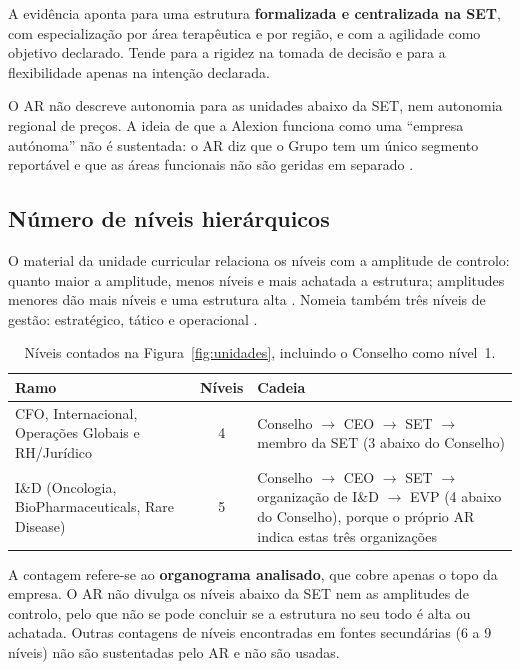 \begin{analysis}
A evidência aponta para uma estrutura \textbf{formalizada e centralizada na SET}, com especialização por área terapêutica e por região, e com a agilidade como objetivo declarado. Tende para a rigidez na tomada de decisão e para a flexibilidade apenas na intenção declarada.
\end{analysis}

\begin{sourceslimit}
O AR não descreve autonomia para as unidades abaixo da SET, nem autonomia regional de preços. A ideia de que a Alexion funciona como uma ``empresa autónoma'' não é sustentada: o AR diz que o Grupo tem um único segmento reportável e que as áreas funcionais não são geridas em separado \cite[p.~147]{AR}.
\end{sourceslimit}

\subsection{Número de níveis hierárquicos}

O material da unidade curricular relaciona os níveis com a amplitude de controlo: quanto maior a amplitude, menos níveis e mais achatada a estrutura; amplitudes menores dão mais níveis e uma estrutura alta \cite[pp.~8--9]{ORG}. Nomeia também três níveis de gestão: estratégico, tático e operacional \cite[p.~7]{ORG}.

\begin{table}[H]\centering
\caption{Níveis contados na Figura~\ref{fig:unidades}, incluindo o Conselho como nível~1.}
\label{tab:niveis}
\begin{tabularx}{\linewidth}{@{}>{\raggedright\arraybackslash}p{4.2cm}cY@{}}
\toprule
\textbf{Ramo} & \textbf{Níveis} & \textbf{Cadeia} \\
\midrule
CFO, Internacional, Operações Globais e RH/Jurídico & 4 & Conselho $\rightarrow$ CEO $\rightarrow$ SET $\rightarrow$ membro da SET (3 abaixo do Conselho) \\
\addlinespace
I\&D (Oncologia, BioPharmaceuticals, Rare Disease) & 5 & Conselho $\rightarrow$ CEO $\rightarrow$ SET $\rightarrow$ organização de I\&D $\rightarrow$ EVP (4 abaixo do Conselho), porque o próprio AR indica estas três organizações \cite[p.~26]{AR} \\
\bottomrule
\end{tabularx}
\end{table}
\begin{sourceslimit}
A contagem refere-se ao \textbf{organograma analisado}, que cobre apenas o topo da empresa. O AR não divulga os níveis abaixo da SET nem as amplitudes de controlo, pelo que não se pode concluir se a estrutura no seu todo é alta ou achatada. Outras contagens de níveis encontradas em fontes secundárias (6 a 9 níveis) não são sustentadas pelo AR e não são usadas.
\end{sourceslimit}

